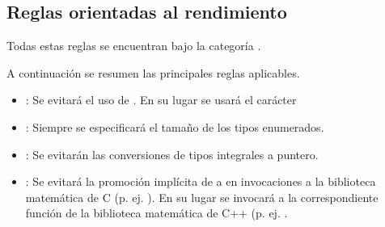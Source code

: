 \subsection{Reglas orientadas al rendimiento}

Todas estas reglas se encuentran bajo la categoría .

A continuación se resumen las principales reglas aplicables.

\begin{itemize}

\item {}:
Se evitará el uso de . 
En su lugar se usará el carácter 

\item {}:
Siempre se especificará el tamaño de los tipos enumerados.

\item {}:
Se evitarán las conversiones de tipos integrales a puntero.

\item {}:
Se evitará la promoción implícita de  a  en 
invocaciones a la biblioteca matemática de C (p. ej. ).
En su lugar se invocará a la correspondiente función de la biblioteca
matemática de C++ (p. ej. .

\end{itemize}
